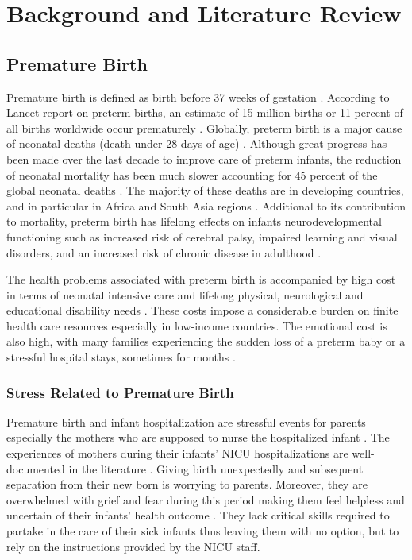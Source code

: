 
\chapter{Background and Literature Review} %

\label{Chapter2} %

\section{Premature Birth}
Premature birth is defined as birth before 37 weeks of gestation \citep{WHO2015, Blencowe2012}.  According to Lancet report on preterm births, an estimate of 15 million births or 11 percent of all births worldwide occur prematurely \citep{Blencowe2012}. Globally, preterm birth is a major cause of neonatal deaths (death under 28 days of age) \citep{Blencowe2012, Morisaki2014}. Although great progress has been made over the last decade to improve care of preterm infants, the reduction of neonatal mortality has been much slower accounting for 45 percent of the global neonatal deaths \citep{TheLancet2008}. The majority of these deaths are in developing countries, and in particular in Africa  and South Asia regions \citep{Koenraads2017}. Additional to its contribution to mortality, preterm birth has lifelong effects on infants neurodevelopmental functioning such as increased risk of cerebral palsy, impaired learning and visual disorders, and an increased risk of chronic disease in adulthood \citep{TheLancet2008}. 
\par
The  health problems associated with preterm birth is accompanied by high cost in terms of neonatal intensive care and lifelong physical, neurological and educational disability needs \citep{Behrman2007}. These costs impose a considerable burden on finite health care resources especially in low-income countries. The emotional cost is also high, with many families experiencing the sudden loss of a preterm baby or a stressful hospital stays, sometimes for months \citep{Blencowe2012}.
\subsection{Stress Related to Premature Birth}
Premature birth and infant hospitalization are stressful events for parents especially the mothers who are supposed to  nurse the hospitalized infant \citep{McGrath2013}. The experiences of mothers during their infants’ NICU hospitalizations are well-documented in the literature \citep{Steyn2017, Franck2003, Turner2015}. Giving birth unexpectedly and subsequent separation from their new  born is worrying to parents. Moreover, they are overwhelmed with grief and fear during this period making them feel helpless and uncertain of their infants' health outcome \citep{Blencowe2012}. They lack critical skills required to partake in the care of their sick infants thus leaving them with no option, but to rely on the instructions provided by the NICU staff.

